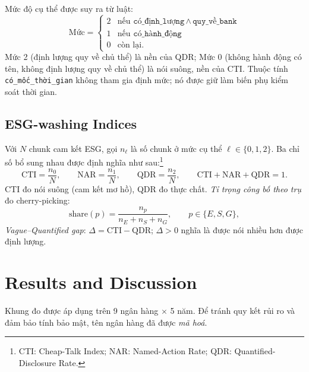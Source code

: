\documentclass[runningheads]{llncs}
\begin{document}
Mức độ cụ thể được suy ra từ luật:
\begin{equation}
\text{Mức} =
\begin{cases}
2 & \text{nếu } \texttt{có\_định\_lượng} \,\wedge\, \texttt{quy\_về\_bank}\\[2pt]
1 & \text{nếu } \texttt{có\_hành\_động}\\[2pt]
0 & \text{còn lại.}
\end{cases}
\end{equation}
Mức 2 (định lượng quy về chủ thể) là nền của QDR; Mức 0 (không hành động có tên, không định lượng quy về chủ thể) là nói suông, nền của CTI. Thuộc tính \texttt{có\_mốc\_thời\_gian} không tham gia định mức; nó được giữ làm biến phụ kiểm soát thời gian.

\subsection{ESG-washing Indices}
Với $N$ chunk cam kết ESG, gọi $n_\ell$ là số chunk ở mức cụ thể $\ell\in\{0,1,2\}$. Ba chỉ số bổ sung nhau được định nghĩa như sau:\footnote{CTI: Cheap-Talk Index; NAR: Named-Action Rate; QDR: Quantified-Disclosure Rate.}
\begin{equation}
\mathrm{CTI}=\frac{n_0}{N},\qquad
\mathrm{NAR}=\frac{n_1}{N},\qquad
\mathrm{QDR}=\frac{n_2}{N},\qquad
\mathrm{CTI}+\mathrm{NAR}+\mathrm{QDR}=1.
\end{equation}
CTI đo nói suông (cam kết mơ hồ), QDR đo thực chất. \emph{Tỉ trọng công bố theo trụ} đo cherry-picking:
\begin{equation}
\mathrm{share}(p)=\frac{n_p}{n_E+n_S+n_G},\qquad p\in\{E,S,G\},
\end{equation}
\emph{Vague--Quantified gap}: $\Delta=\mathrm{CTI}-\mathrm{QDR}$; $\Delta>0$ nghĩa là được nói nhiều hơn được định lượng.


\section{Results and Discussion}
\label{sec:results}
Khung đo được áp dụng trên 9 ngân hàng $\times$ 5 năm. Để tránh quy kết rủi ro và đảm bảo tính bảo mật, tên ngân hàng đã được \emph{mã hoá}.
\end{document}
